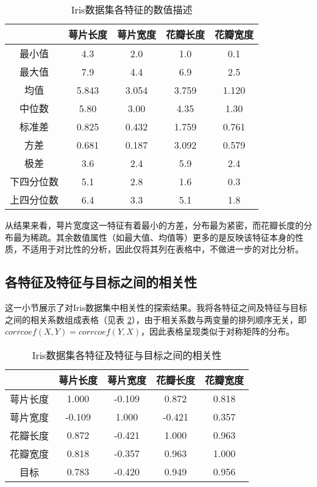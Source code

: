 \documentclass[12pt,a4paper]{article}
\theoremstyle{definition}
\begin{document}
\begin{table}[H]
	\renewcommand\arraystretch{1.35}
	\caption{Iris数据集各特征的数值描述}
	\label{tab:iris_att}
	\centering
	
	\begin{tabular}{c|cccc}
		\centering
		 & 萼片长度 & 萼片宽度 & 花瓣长度 & 花瓣宽度 \\
		\hline
		最小值 & 4.3 & 2.0 & 1.0 & 0.1 \\
		最大值 & 7.9 & 4.4 & 6.9 & 2.5 \\
		均值 & 5.843 & 3.054 & 3.759 & 1.120 \\
		中位数 & 5.80 & 3.00 & 4.35 & 1.30 \\
		标准差 & 0.825 & 0.432 & 1.759 & 0.761 \\
		方差 & 0.681 & 0.187 & 3.092 & 0.579 \\
		极差 & 3.6 & 2.4 & 5.9 & 2.4 \\
		下四分位数 & 5.1 & 2.8 & 1.6 & 0.3 \\
		上四分位数 & 6.4 & 3.3 & 5.1 & 1.8 \\
	\end{tabular}
\end{table}

从结果来看，萼片宽度这一特征有着最小的方差，分布最为紧密，而花瓣长度的分布最为稀疏。其余数值属性（如最大值、均值等）更多的是反映该特征本身的性质，不适用于对比性的分析，因此仅将其列在表格中，不做进一步的对比分析。

\subsection{各特征及特征与目标之间的相关性}
\label{sec:iris_coff}

这一小节展示了对Iris数据集中相关性的探索结果。我将各特征之间及特征与目标之间的相关系数组成表格（见表 \ref{tab:iris_co}），由于相关系数与两变量的排列顺序无关，即$corrcoef(X, Y) = corrcoef(Y, X)$，因此表格呈现类似于对称矩阵的分布。

\begin{table}[H]
	\renewcommand\arraystretch{1.35}
	\caption{Iris数据集各特征及特征与目标之间的相关性}
	\label{tab:iris_co}
	\centering
	
	\begin{tabular}{c|cccc}
		\centering
		 & 萼片长度 & 萼片宽度 & 花瓣长度 & 花瓣宽度 \\
		\hline
		萼片长度 & 1.000 & -0.109 & 0.872 & 0.818 \\
		萼片宽度 & -0.109 & 1.000 & -0.421 & 0.357 \\
		花瓣长度 & 0.872 & -0.421 & 1.000 & 0.963 \\
		花瓣宽度 & 0.818 & -0.357 & 0.963 & 1.000 \\
		目标 & 0.783 & -0.420 & 0.949 & 0.956 \\
	\end{tabular}
\end{table}
\end{document}
